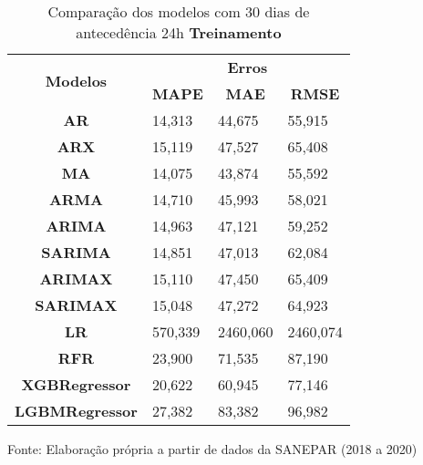 \begin{table}[H]
	\centering
	\caption{Comparação dos modelos com 30 dias de antecedência 24h \textbf{Treinamento} }\label{tb:60-24trn}
	\begin{tabular}{@{}clll@{}}
		\toprule
		\multirow{2}{*}{\textbf{Modelos}} & \multicolumn{3}{c}{\textbf{Erros}}                                                                       \\ \cmidrule(l){2-4} 
		& \multicolumn{1}{c}{\textbf{MAPE}} & \multicolumn{1}{c}{\textbf{MAE}} & \multicolumn{1}{c}{\textbf{RMSE}} \\ \hline
\textbf{AR}                       & 14,313                            & 44,675                           & 55,915                            \\
\textbf{ARX}                      & 15,119                            & 47,527                           & 65,408                            \\
\textbf{MA}                       & 14,075                            & 43,874                           & 55,592                            \\
\textbf{ARMA}                     & 14,710                            & 45,993                           & 58,021                            \\
\textbf{ARIMA}                    & 14,963                            & 47,121                           & 59,252                            \\
\textbf{SARIMA}                   & 14,851                            & 47,013                           & 62,084                            \\
\textbf{ARIMAX}                   & 15,110                            & 47,450                           & 65,409                            \\
\textbf{SARIMAX}                  & 15,048                            & 47,272                           & 64,923                            \\
\textbf{LR}        & 570,339                           & 2460,060                         & 2460,074                          \\
\textbf{RFR}  & 23,900                            & 71,535                           & 87,190                            \\
\textbf{XGBRegressor}             & 20,622                            & 60,945                           & 77,146                            \\
\textbf{LGBMRegressor}            & 27,382                            & 83,382                           & 96,982                            \\ \bottomrule
	\end{tabular}

Fonte: Elaboração própria a partir de dados da SANEPAR (2018 a 2020)
\end{table}

